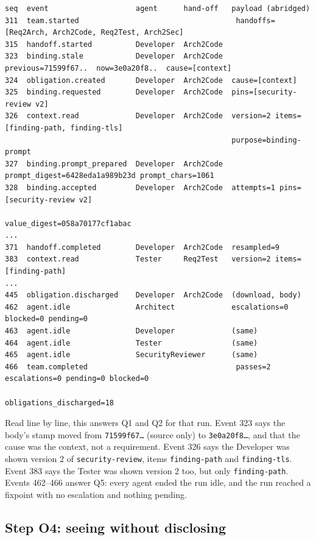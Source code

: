 \documentclass[10pt,a4paper]{article}
\newcommand{\code}[1]{\texttt{#1}}
\theoremstyle{definition}
\begin{document}
\begin{lstlisting}[style=engine, caption={Timeline excerpt: the first context-aware run, for (\code{ce download}, \code{body}).}, label={lst:timeline}]
seq  event                    agent      hand-off   payload (abridged)
311  team.started                                    handoffs=[Req2Arch, Arch2Code, Req2Test, Arch2Sec]
315  handoff.started          Developer  Arch2Code
323  binding.stale            Developer  Arch2Code  previous=71599f67..  now=3e0a20f8..  cause=[context]
324  obligation.created       Developer  Arch2Code  cause=[context]
325  binding.requested        Developer  Arch2Code  pins=[security-review v2]
326  context.read             Developer  Arch2Code  version=2 items=[finding-path, finding-tls]
                                                    purpose=binding-prompt
327  binding.prompt_prepared  Developer  Arch2Code  prompt_digest=6428eda1a989b23d prompt_chars=1061
328  binding.accepted         Developer  Arch2Code  attempts=1 pins=[security-review v2]
                                                    value_digest=058a70177cf1abac
...
371  handoff.completed        Developer  Arch2Code  resampled=9
383  context.read             Tester     Req2Test   version=2 items=[finding-path]
...
445  obligation.discharged    Developer  Arch2Code  (download, body)
462  agent.idle               Architect             escalations=0 blocked=0 pending=0
463  agent.idle               Developer             (same)
464  agent.idle               Tester                (same)
465  agent.idle               SecurityReviewer      (same)
466  team.completed                                  passes=2 escalations=0 pending=0 blocked=0
                                                    obligations_discharged=18
\end{lstlisting}

\noindent Read line by line, this answers Q1 and Q2 for that run. Event 323
says the body's stamp moved from \code{71599f67\ldots} (source only) to
\code{3e0a20f8\ldots}, and that the cause was the context, not a
requirement. Event 326 says the Developer was shown version 2 of
\code{security-review}, items \code{finding-path} and \code{finding-tls}.
Event 383 says the Tester was shown version 2 too, but only
\code{finding-path}. Events 462--466 answer Q5: every agent ended the run
idle, and the run reached a fixpoint with no escalation and nothing pending.

\subsection{Step O4: seeing without disclosing}\label{sec:obs-privacy}
\end{document}
